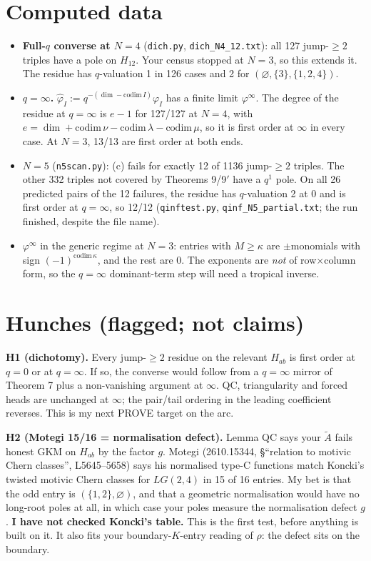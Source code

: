 \documentclass[10pt]{article}
\newcommand{\Atil}{\tilde A}
\theoremstyle{plain}
\begin{document}
\section{Computed data}
\begin{itemize}
\item \textbf{Full-$q$ converse at $N=4$} (\texttt{dich.py}, \texttt{dich\_N4\_12.txt}): all 127 jump-$\ge2$ triples have a pole on $H_{12}$. Your
census stopped at $N=3$, so this extends it. The residue has $q$-valuation 1 in 126 cases and 2 for $(\varnothing,\{3\},\{1,2,4\})$.
\item \textbf{$q=\infty$.} $\hat\varphi_I:=q^{-(\dim-\mathrm{codim}\,I)}\varphi_I$ has a finite limit $\varphi^\infty$. The degree of the residue at
$q=\infty$ is $e-1$ for 127/127 at $N=4$, with $e=\dim+\mathrm{codim}\,\nu-\mathrm{codim}\,\lambda-\mathrm{codim}\,\mu$, so it is first order at
$\infty$ in every case. At $N=3$, 13/13 are first order at both ends.
\item \textbf{$N=5$} (\texttt{n5scan.py}): (c) fails for exactly 12 of 1136 jump-$\ge2$ triples. The other 332 triples not covered by Theorems 9/9$'$ have a
$q^1$ pole. On all 26 predicted pairs of the 12 failures, the residue has $q$-valuation 2 at $0$ and is first order at $q=\infty$, so 12/12
(\texttt{qinftest.py}, \texttt{qinf\_N5\_partial.txt}; the run finished, despite the file name).
\item $\varphi^\infty$ in the generic regime at $N=3$: entries with $M\ge\kappa$ are $\pm$monomials with sign $(-1)^{\mathrm{codim}\,\kappa}$, and the rest are 0.
The exponents are \emph{not} of row$\times$column form, so the $q=\infty$ dominant-term step will need a tropical inverse.
\end{itemize}

\section{Hunches (flagged; not claims)}
\textbf{H1 (dichotomy).} Every jump-$\ge2$ residue on the relevant $H_{ab}$ is first order at $q=0$ or at $q=\infty$. If so, the converse would follow from a
$q=\infty$ mirror of Theorem 7 plus a non-vanishing argument at $\infty$. QC, triangularity and forced heads are unchanged at $\infty$; the pair/tail
ordering in the leading coefficient reverses. This is my next PROVE target on the arc.

\textbf{H2 (Motegi 15/16 = normalisation defect).} Lemma QC says your $\Atil$ fails honest GKM on $H_{ab}$ by the factor $g$. Motegi (2610.15344,
\S``relation to motivic Chern classes'', L5645--5658) says his normalised type-C functions match Koncki's twisted motivic Chern classes for $LG(2,4)$ in
15 of 16 entries. My bet is that the odd entry is $(\{1,2\},\varnothing)$, and that a geometric normalisation would have no long-root poles at all, in which
case your poles measure the normalisation defect $g$. \textbf{I have not checked Koncki's table.} This is the first test, before anything is built on it.
It also fits your boundary-$K$-entry reading of $\rho$: the defect sits on the boundary.
\end{document}
